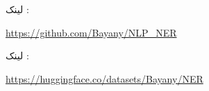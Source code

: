                   
   
لینک  :

 \begin{latin}
 \url{https://github.com/Bayany/NLP_NER}
 \end{latin}

لینک :
 \begin{latin}
\url{https://huggingface.co/datasets/Bayany/NER}
 \end{latin}
 
